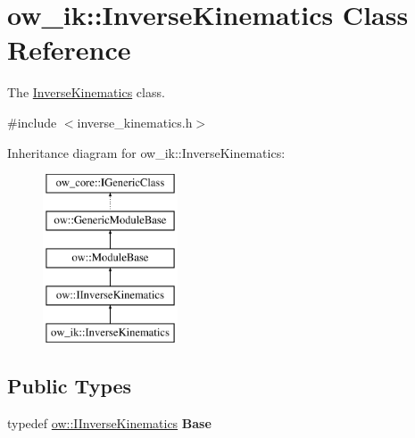 \hypertarget{classow__ik_1_1InverseKinematics}{}\section{ow\+\_\+ik\+:\+:Inverse\+Kinematics Class Reference}
\label{classow__ik_1_1InverseKinematics}


The \hyperlink{classow__ik_1_1InverseKinematics}{Inverse\+Kinematics} class.  




{\ttfamily \#include $<$inverse\+\_\+kinematics.\+h$>$}

Inheritance diagram for ow\+\_\+ik\+:\+:Inverse\+Kinematics\+:\begin{figure}[H]
\begin{center}
\leavevmode
\includegraphics[height=5.000000cm]{d8/d51/classow__ik_1_1InverseKinematics}
\end{center}
\end{figure}
\subsection*{Public Types}
\begin{DoxyCompactItemize}
\item 
typedef \hyperlink{classow_1_1IInverseKinematics}{ow\+::\+I\+Inverse\+Kinematics} {\bfseries Base}\hypertarget{classow__ik_1_1InverseKinematics_af81d384c3f84c9f9190ea55c3434324b}{}\label{classow__ik_1_1InverseKinematics_af81d384c3f84c9f9190ea55c3434324b}

\end{DoxyCompactItemize}
